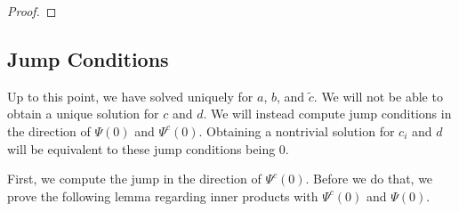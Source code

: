 \documentclass[thesis.tex]{subfiles}
\begin{document}
\begin{lemma}
\begin{proof}
\end{proof}
\end{lemma}

\subsection{Jump Conditions}

Up to this point, we have solved uniquely for $a$, $b$, and $\tilde{c}$. We will not be able to obtain a unique solution for $c$ and $d$. We will instead compute jump conditions in the direction of $\Psi(0)$ and $\Psi^c(0)$. Obtaining a nontrivial solution for $c_i$ and $d$ will be equivalent to these jump conditions being 0.

First, we compute the jump in the direction of $\Psi^c(0)$. Before we do that, we prove the following lemma regarding inner products with $\Psi^c(0)$ and $\Psi(0)$.
\end{document}
